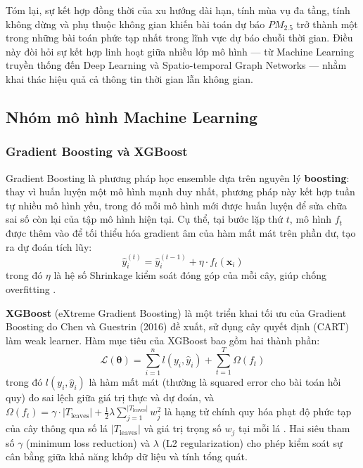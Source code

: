 Tóm lại, sự kết hợp đồng thời của xu hướng dài hạn, tính mùa vụ đa tầng, tính không dừng và phụ thuộc không gian khiến bài toán dự báo $PM_{2.5}$ trở thành một trong những bài toán phức tạp nhất trong lĩnh vực dự báo chuỗi thời gian. Điều này đòi hỏi sự kết hợp linh hoạt giữa nhiều lớp mô hình — từ Machine Learning truyền thống đến Deep Learning và Spatio-temporal Graph Networks — nhằm khai thác hiệu quả cả thông tin thời gian lẫn không gian.

\subsection{Nhóm mô hình Machine Learning}
\subsubsection{Gradient Boosting và XGBoost}

Gradient Boosting là phương pháp học ensemble dựa trên nguyên lý \textbf{boosting}: thay vì huấn luyện một mô hình mạnh duy nhất, phương pháp này kết hợp tuần tự nhiều mô hình yếu, trong đó mỗi mô hình mới được huấn luyện để sửa chữa sai số còn lại của tập mô hình hiện tại. Cụ thể, tại bước lặp thứ $t$, mô hình $f_t$ được thêm vào để tối thiểu hóa gradient âm của hàm mất mát trên phần dư, tạo ra dự đoán tích lũy:
\begin{equation}
    \hat{y}_i^{(t)} = \hat{y}_i^{(t-1)} + \eta \cdot f_t(\mathbf{x}_i)
\end{equation}
trong đó $\eta$ là hệ số Shrinkage kiểm soát đóng góp của mỗi cây, giúp chống overfitting \cite{Chen_2016}.

\textbf{XGBoost} (eXtreme Gradient Boosting) là một triển khai tối ưu của Gradient Boosting do Chen và Guestrin (2016) đề xuất, sử dụng cây quyết định (CART) làm weak learner. Hàm mục tiêu của XGBoost bao gồm hai thành phần:
\begin{equation}
    \mathcal{L}(\boldsymbol{\theta}) = \sum_{i=1}^{n} l(y_i, \hat{y}_i) + \sum_{t=1}^{T} \Omega(f_t)
\end{equation}
trong đó $l(y_i, \hat{y}_i)$ là hàm mất mát (thường là squared error cho bài toán hồi quy) đo sai lệch giữa giá trị thực và dự đoán, và $\Omega(f_t) = \gamma \cdot |T_{\text{leaves}}| + \frac{1}{2}\lambda \sum_{j=1}^{|T_{\text{leaves}}|} w_j^2$ là hạng tử chính quy hóa phạt độ phức tạp của cây thông qua số lá $|T_{\text{leaves}}|$ và giá trị trọng số $w_j$ tại mỗi lá \cite{Chen_2016}. Hai siêu tham số $\gamma$ (minimum loss reduction) và $\lambda$ (L2 regularization) cho phép kiểm soát sự cân bằng giữa khả năng khớp dữ liệu và tính tổng quát.

